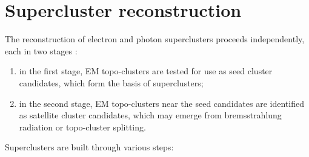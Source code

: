 \documentclass[a4paper, oneside]{book}
\begin{document}
			
		\section{Supercluster reconstruction}\label{section:super cl}
		The reconstruction of electron and photon superclusters proceeds independently, each in two stages \cite{El ph reco}:
		\begin{enumerate}
		\item in the first stage, EM topo-clusters are tested for use as seed cluster candidates, which form the basis of superclusters; 
		\item in the second stage, EM topo-clusters near the seed candidates are identified as satellite cluster candidates, which may emerge from bremsstrahlung radiation or topo-cluster splitting.
		\end{enumerate}
		Superclusters are built through various steps:
\end{document}
